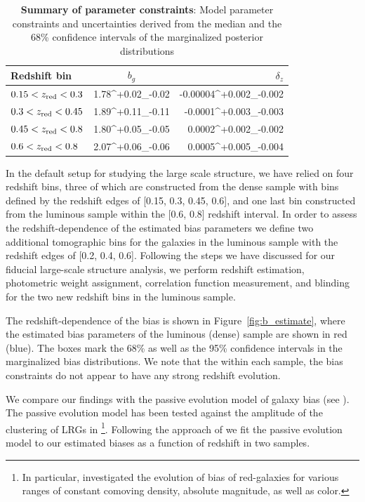 \documentclass[fleqn,usenatbib,useAMS]{mnras}
\begin{document}
\begin{table}
	\centering
	\caption{\textbf{Summary of parameter constraints}: Model parameter constraints and uncertainties derived from the median and the 68\% confidence intervals of the marginalized posterior distributions}
	\label{tab:constraints}
	\begin{tabularx}{0.8\columnwidth}{lcr} %
		\hline
		Redshift bin & $b_g$ & $\delta_z$\\
		\hline
		$0.15<z_{\rm red}<0.3$ & 1.78^{+0.02}_{-0.02} & -0.00004^{+0.002}_{-0.002}\\
		$0.3<z_{\rm red}<0.45$ & 1.89^{+0.11}_{-0.11} & -0.0001^{+0.003}_{-0.003} \\
        $0.45<z_{\rm red}<0.8$ & 1.80^{+0.05}_{-0.05} & 0.0002^{+0.002}_{-0.002}\\
        $0.6<z_{\rm red}<0.8$ & 2.07^{+0.06}_{-0.06} & 0.0005^{+0.005}_{-0.004}\\
		\hline
	\end{tabularx}
\end{table}

In the default setup for studying the large scale structure, we have relied on four redshift bins, three of which are constructed from the dense sample with bins defined by the redshift edges of [0.15, 0.3, 0.45, 0.6], and one last bin constructed from the luminous sample within the [0.6, 0.8] redshift interval. In order to assess the redshift-dependence of the estimated bias parameters we define two additional tomographic bins for the galaxies in the luminous sample with the redshift edges of [0.2, 0.4, 0.6]. Following the steps we have discussed for our fiducial large-scale structure analysis, we perform redshift estimation, photometric weight assignment, correlation function measurement, and blinding for the two new redshift bins in the luminous sample.  

The redshift-dependence of the bias is shown in Figure~\ref{fig:b_estimate}, where the estimated bias parameters of the luminous (dense) sample are shown in red (blue). The boxes mark the 68\% as well as the 95\% confidence intervals in the marginalized bias distributions. We note that the within each sample, the bias constraints do not appear to have any strong redshift evolution. 

We compare our findings with the passive evolution model of galaxy bias (see \citealt{Fry1996, Tegmark1998}). The passive evolution model has been tested against the amplitude of the clustering of LRGs in \citet{Rita2012, Guo2013}\footnote{In particular, \citet{Guo2013} investigated the evolution of bias of red-galaxies for various ranges of constant comoving density, absolute magnitude, as well as color.}. Following the approach of \citet{Guo2013} we fit the passive evolution model to our estimated biases as a function of redshift in two samples.   
\end{document}
